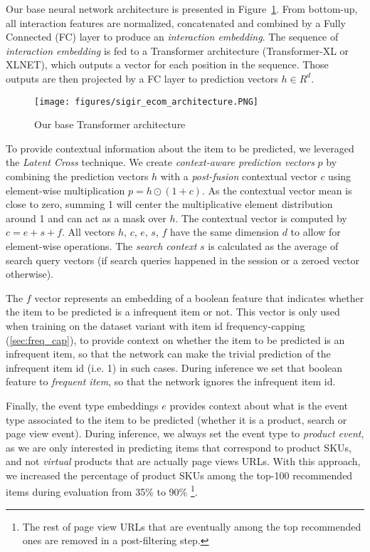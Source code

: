 \documentclass[sigconf,screen]{acmart}
\begin{document}
Our base neural network architecture is presented in Figure~\ref{fig:architecture}. From bottom-up, all interaction features are normalized, concatenated and combined by a Fully Connected (FC) layer to produce an \emph{interaction embedding}. The sequence of \emph{interaction embedding} is fed to a Transformer architecture (Transformer-XL or XLNET), which outputs a vector for each position in the sequence. Those outputs are then projected by a FC layer to prediction vectors $ h \in  R^d $.

\begin{figure}[ht]
  \centering
  \texttt{[image: figures/sigir\_ecom\_architecture.PNG]}
  \caption{Our base Transformer architecture}
  \label{fig:architecture}
  
\end{figure}


To provide contextual information about the item to be predicted, we leveraged the \emph{Latent Cross} \cite{beutel2018latent} technique. We create \emph{context-aware prediction vectors} $ p $ by combining the prediction vectors $ h $ with a \emph{post-fusion} contextual vector $ c $ using element-wise multiplication $ p = h \odot (1 + c) $. As the contextual vector mean is close to zero, summing 1 will center the multiplicative element distribution around 1 and can act as a mask over $ h $. The contextual vector is computed by $ c = e + s + f $. All vectors $h$, $c$, $e$, $s$, $f$ have the same dimension $d$ to allow for element-wise operations. The \emph{search context} $ s $ is calculated as the average of search query vectors (if search queries happened in the session or a zeroed vector otherwise). 

The $ f $ vector represents an embedding of a boolean feature that indicates whether the item to be predicted is a infrequent item or not. This vector is only used when training on the dataset variant with item id frequency-capping (\cref{sec:freq_cap}), to provide context on whether the item to be predicted is an infrequent item, so that the network can make the trivial prediction of the infrequent item id (i.e. 1) in such cases. During inference we set that boolean feature to \emph{frequent item}, so that the network ignores the infrequent item id.

Finally, the event type embeddings $ e $ provides context about what is the event type associated to the item to be predicted (whether it is a product, search or page view event). During inference, we always set the event type to \emph{product event}, as we are only interested in predicting items that correspond to product SKUs, and not \emph{virtual} products that are actually page views URLs. With this approach, we increased the percentage of product SKUs among the top-100 recommended items during evaluation from 35\% to 90\% \footnote{The rest of page view URLs that are eventually among the top recommended ones are removed in a post-filtering step.}.
\end{document}
